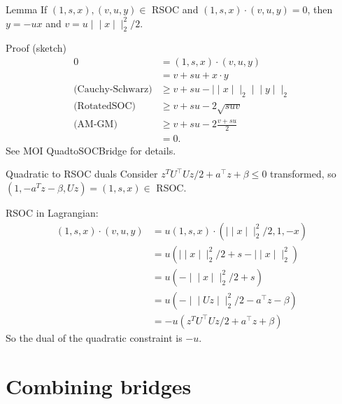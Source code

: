 \documentclass{beamer}
\def\lVert{\mid\!\mid}
\def\rVert{\mid\!\mid}
\begin{document}
\begin{frame}{Lemma}
  If $(1, s, x), (v, u, y) \in {}$ RSOC and
  $(1, s, x) \cdot (v, u, y) = 0$, then
  $y = -ux$ and $v = u \lVert x \rVert_2^2/2$.

  \begin{block}{Proof (sketch)}
    \begin{align*}
      0 & = (1, s, x) \cdot (v, u, y)\\
      & = v + s u + x \cdot y\\
      \text{(Cauchy-Schwarz)} & \ge
      v + s u - \lVert x\lVert_2 \lVert y\lVert_2\\
      \text{(RotatedSOC)} & \ge
      v + s u - 2 \sqrt{s u  v}\\
      \text{(AM-GM)} & \ge
      v + s  u - 2  \frac{v + s u}{2}\\
      & = 0.
    \end{align*}
    See MOI QuadtoSOCBridge for details.
  \end{block}
\end{frame}

\begin{frame}{Quadratic to RSOC duals}
  Consider $z^T U^\top U z/2 + a^\top z + \beta \le 0$ transformed,
  so $(1, -a^T z - \beta, Uz) = (1, s, x) \in {}$ RSOC.

  RSOC in Lagrangian:
  \begin{align*}
    (1, s, x) \cdot (v, u, y)
    & = u (1, s, x) \cdot (\lVert x \rVert_2^2/2, 1, -x)\\
    & = u (\lVert x \rVert_2^2/2 + s - \lVert x \rVert_2^2)\\
    & = u (-\lVert x \rVert_2^2/2 + s)\\
    & = u (-\lVert Uz \rVert_2^2/2 - a^\top z - \beta)\\
    & = -u (z^T U^\top U z/2 + a^\top z + \beta)
  \end{align*}
  So the dual of the quadratic constraint is $-u$.
\end{frame}

\section{Combining bridges}
\end{document}
